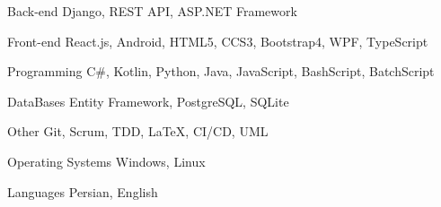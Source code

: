 

\begin{cvskills}

  \cvskill
  {Back-end} %
  {Django, REST API, ASP.NET Framework} %

  \cvskill
  {Front-end} %
  {React.js, Android, HTML5, CCS3, Bootstrap4, WPF, TypeScript} %

  \cvskill
  {Programming} %
  {C\#, Kotlin, Python, Java, JavaScript, BashScript, BatchScript} %

  \cvskill
  {DataBases} %
  {Entity Framework, PostgreSQL, SQLite} %


  \cvskill
  {Other} %
  {Git, Scrum, TDD, \LaTeX, CI/CD, UML} %


  \cvskill
  {Operating Systems} %
  {Windows, Linux} %


  \cvskill
  {Languages} %
  {Persian, English} %


\end{cvskills}
